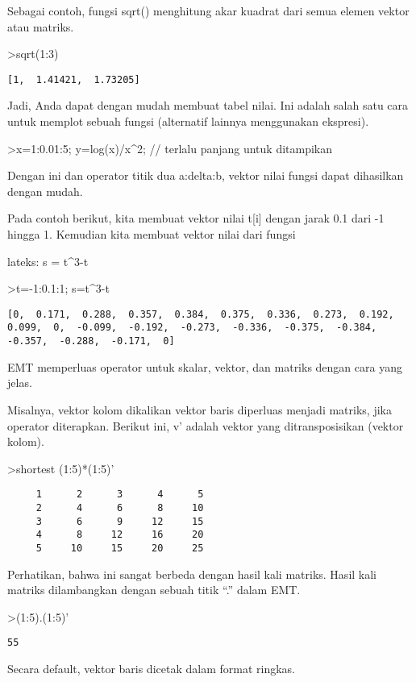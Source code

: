 \documentclass[
]{book}
\begin{document}
Sebagai contoh, fungsi sqrt() menghitung akar kuadrat dari semua elemen vektor atau matriks.

\textgreater sqrt(1:3)

\begin{verbatim}
[1,  1.41421,  1.73205]
\end{verbatim}

Jadi, Anda dapat dengan mudah membuat tabel nilai. Ini adalah salah satu cara untuk memplot sebuah fungsi (alternatif lainnya menggunakan ekspresi).

\textgreater x=1:0.01:5; y=log(x)/x\^{}2; // terlalu panjang untuk ditampikan

Dengan ini dan operator titik dua a:delta:b, vektor nilai fungsi dapat dihasilkan dengan mudah.

Pada contoh berikut, kita membuat vektor nilai t{[}i{]} dengan jarak 0.1 dari -1 hingga 1. Kemudian kita membuat vektor nilai dari fungsi

lateks: s = t\^{}3-t

\textgreater t=-1:0.1:1; s=t\^{}3-t

\begin{verbatim}
[0,  0.171,  0.288,  0.357,  0.384,  0.375,  0.336,  0.273,  0.192,
0.099,  0,  -0.099,  -0.192,  -0.273,  -0.336,  -0.375,  -0.384,
-0.357,  -0.288,  -0.171,  0]
\end{verbatim}

EMT memperluas operator untuk skalar, vektor, dan matriks dengan cara yang jelas.

Misalnya, vektor kolom dikalikan vektor baris diperluas menjadi matriks, jika operator diterapkan. Berikut ini, v' adalah vektor yang ditransposisikan (vektor kolom).

\textgreater shortest (1:5)*(1:5)'

\begin{verbatim}
     1      2      3      4      5 
     2      4      6      8     10 
     3      6      9     12     15 
     4      8     12     16     20 
     5     10     15     20     25 
\end{verbatim}

Perhatikan, bahwa ini sangat berbeda dengan hasil kali matriks. Hasil kali matriks dilambangkan dengan sebuah titik ``.'' dalam EMT.

\textgreater(1:5).(1:5)'

\begin{verbatim}
55
\end{verbatim}

Secara default, vektor baris dicetak dalam format ringkas.
\end{document}
